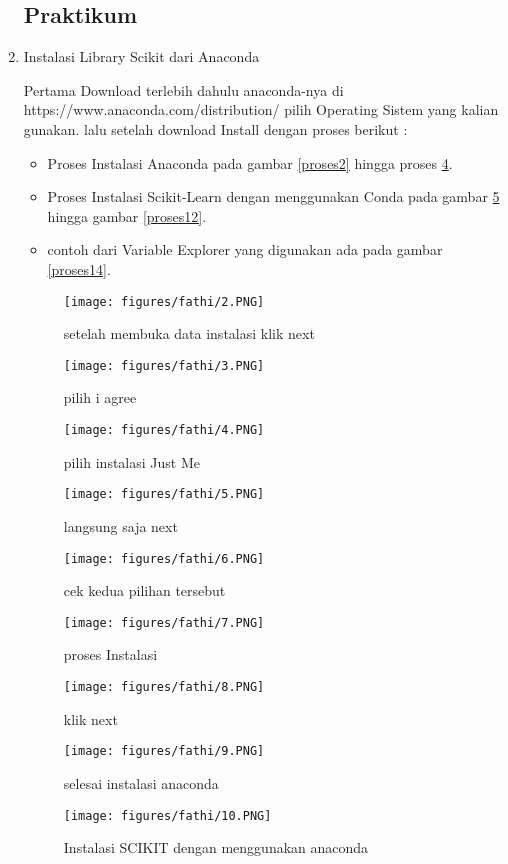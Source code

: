 \begin{enumerate}
\subsection{Praktikum}
\item
Instalasi Library Scikit dari Anaconda

\subitem
Pertama Download terlebih dahulu anaconda-nya di https://www.anaconda.com/distribution/ pilih Operating Sistem yang kalian gunakan. lalu setelah download Install dengan proses berikut :
\begin{itemize}
\item
Proses Instalasi Anaconda pada gambar \ref{proses2} hingga proses \ref{proses9}.
\item
Proses Instalasi Scikit-Learn dengan menggunakan Conda pada gambar \ref{proses10} hingga gambar \ref{proses12}.
\item
contoh dari Variable Explorer yang digunakan ada pada gambar \ref{proses14}.
\end{itemize}
\begin{figure}[ht]
\centerline{\texttt{[image: figures/fathi/2.PNG]}}
\caption{setelah membuka data instalasi klik next}
\label{proses2}

\centerline{\texttt{[image: figures/fathi/3.PNG]}}
\caption{pilih i agree}
\label{proses3}
\end{figure}
\begin{figure}
\centerline{\texttt{[image: figures/fathi/4.PNG]}}
\caption{pilih instalasi Just Me}
\label{proses4}

\centerline{\texttt{[image: figures/fathi/5.PNG]}}
\caption{langsung saja next}
\label{proses5}
\end{figure}
\begin{figure}
\centerline{\texttt{[image: figures/fathi/6.PNG]}}
\caption{cek kedua pilihan tersebut}
\label{proses6}

\centerline{\texttt{[image: figures/fathi/7.PNG]}}
\caption{proses Instalasi}
\label{proses7}
\end{figure}
\begin{figure}
\centerline{\texttt{[image: figures/fathi/8.PNG]}}
\caption{klik next}
\label{proses8}

\centerline{\texttt{[image: figures/fathi/9.PNG]}}
\caption{selesai instalasi anaconda}
\label{proses9}
\end{figure}
\begin{figure}
\centerline{\texttt{[image: figures/fathi/10.PNG]}}
\caption{Instalasi SCIKIT dengan menggunakan anaconda}
\label{proses10}


\end{figure}
\end{enumerate}
